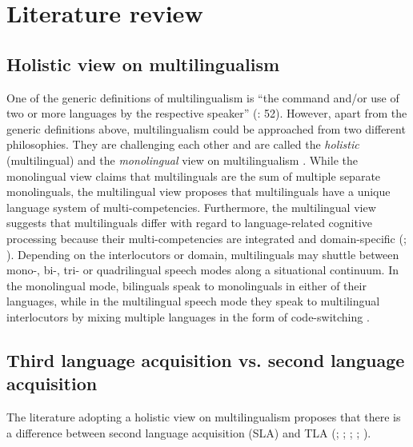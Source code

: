 \documentclass[output=paper]{../langscibook}
\begin{document}
\section{Literature review}


\subsection{Holistic view on multilingualism}



One of the generic definitions of multilingualism is “the command and\slash or use of two or more languages by the respective speaker” (\citealt{HerdinaJessner2002}: 52). However, apart from the generic definitions above, multilingualism could be approached from two different philosophies. They are challenging each other and are called the \emph{holistic} (multilingual) and the \emph{monolingual} view on multilingualism \citep{Grosjean2008}. While the monolingual view claims that multilinguals are the sum of multiple separate monolinguals, the multilingual view proposes that multilinguals have a unique language system of multi-competencies. {Furthermore}, the multilingual view suggests that multilinguals differ with regard to language-related cognitive processing because their multi-competencies are integrated and domain-specific (\citealt{Cook1993}; \citealt{Grosjean2008}). Depending on the interlocutors or domain, multilinguals may shuttle between mono-, bi-, tri- or quadrilingual speech modes along a situational continuum. In the monolingual mode, bilinguals speak to monolinguals in either of their languages, while in the multilingual speech mode they speak to multilingual interlocutors by mixing multiple languages in the form of code-switching \citep{Grosjean2008}.



\subsection{Third language acquisition vs. second language acquisition}



The literature adopting a holistic view on multilingualism proposes that there is a difference between second language acquisition (SLA) and TLA (\citealt{Jessner1999}; \citealt{HerdinaJessner2002}; \citealt{Hufeisen2004}; \citealt{MarxHufeisen2004}; \citealt{Cenoz2013a,Cenoz2013b}).
\end{document}
